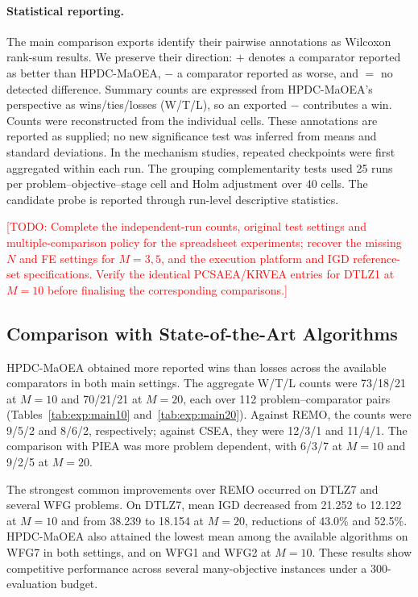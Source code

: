 \documentclass[final,5p,times,twocolumn]{elsarticle}
\newcommand{\TODO}[1]{\textcolor{red}{[TODO: #1]}}
\begin{document}
\paragraph{Statistical reporting.}
The main comparison exports identify their pairwise annotations as Wilcoxon
rank-sum results. We preserve their direction: $+$ denotes a comparator
reported as better than HPDC-MaOEA, $-$ a comparator reported as worse, and
$=$ no detected difference. Summary counts are expressed from HPDC-MaOEA's
perspective as wins/ties/losses (W/T/L), so an exported $-$ contributes a win.
Counts were reconstructed from the individual cells. These annotations are
reported as supplied; no new significance test was inferred from means and
standard deviations. In the mechanism studies, repeated checkpoints were
first aggregated within each run. The grouping complementarity tests used
25 runs per problem--objective--stage cell and Holm adjustment over 40 cells.
The candidate probe is reported through run-level descriptive statistics.

\TODO{Complete the independent-run counts, original test settings and
multiple-comparison policy for the spreadsheet experiments; recover the
missing $N$ and FE settings for $M=3,5$, and the execution platform and IGD
reference-set specifications. Verify the identical PCSAEA/KRVEA entries for
DTLZ1 at $M=10$ before finalising the corresponding comparisons.}

\subsection{Comparison with State-of-the-Art Algorithms}
\label{sec:exp:comparison}

HPDC-MaOEA obtained more reported wins than losses across the available
comparators in both main settings. The aggregate W/T/L counts were
73/18/21 at $M=10$ and 70/21/21 at $M=20$, each over 112 problem--comparator
pairs (Tables~\ref{tab:exp:main10} and~\ref{tab:exp:main20}). Against REMO,
the counts were 9/5/2 and 8/6/2, respectively; against CSEA, they were
12/3/1 and 11/4/1. The comparison with PIEA was more problem dependent,
with 6/3/7 at $M=10$ and 9/2/5 at $M=20$.

The strongest common improvements over REMO occurred on DTLZ7 and several
WFG problems. On DTLZ7, mean IGD decreased from 21.252 to 12.122 at $M=10$
and from 38.239 to 18.154 at $M=20$, reductions of 43.0\% and 52.5\%.
HPDC-MaOEA also attained the lowest mean among the available algorithms on
WFG7 in both settings, and on WFG1 and WFG2 at $M=10$. These results show
competitive performance across several many-objective instances under a
300-evaluation budget.
\end{document}
